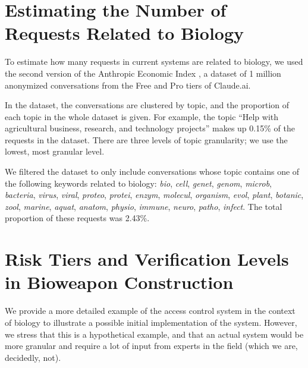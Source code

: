 \documentclass{article}
\theoremstyle{plain}
\theoremstyle{definition}
\theoremstyle{remark}
\begin{document}



\newpage
\appendix

\section{Estimating the Number of Requests Related to Biology} \label{appendix:estimating-biology-requests}

To estimate how many requests in current systems are related to biology, we used the second version of the Anthropic Economic Index \cite{handa2025economictasksperformedai}, a dataset of 1 million anonymized conversations from the Free and Pro tiers of Claude.ai.

In the dataset, the conversations are clustered by topic, and the proportion of each topic in the whole dataset is given.
For example, the topic ``Help with agricultural business, research, and technology projects'' makes up 0.15\% of the requests in the dataset.
There are three levels of topic granularity; we use the lowest, most granular level.

We filtered the dataset to only include conversations whose topic contains one of the following keywords related to biology: \emph{bio}, \emph{cell}, \emph{genet}, \emph{genom}, \emph{microb}, \emph{bacteria}, \emph{virus}, \emph{viral}, \emph{proteo}, \emph{protei}, \emph{enzym}, \emph{molecul}, \emph{organism}, \emph{evol}, \emph{plant}, \emph{botanic}, \emph{zool}, \emph{marine}, \emph{aquat}, \emph{anatom}, \emph{physio}, \emph{immune}, \emph{neuro}, \emph{patho}, \emph{infect}.
The total proportion of these requests was 2.43\%.

\section{Risk Tiers and Verification Levels in Bioweapon Construction}

We provide a more detailed example of the access control system in the context of biology to illustrate a possible initial implementation of the system.
However, we stress that this is a hypothetical example, and that an actual system would be more granular and require a lot of input from experts in the field (which we are, decidedly, not).
\end{document}
